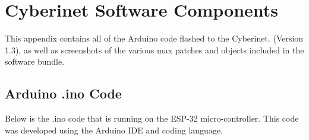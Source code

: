 



\chapter{Cyberinet Software Components}
This appendix contains all of the Arduino code flashed to the Cyberinet. (Version 1.3), as well as screenshots of the various max patches and objects included in the software bundle.

\section{Arduino .ino Code}

Below is the .ino code that is running on the ESP-32 micro-controller. This code was developed using the Arduino IDE and coding language.

